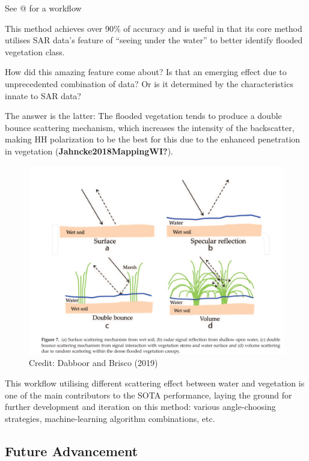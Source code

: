 \documentclass[
  letterpaper,
  DIV=11,
  numbers=noendperiod]{scrreprt}
\begin{document}
See @ for a workflow

This method achieves over 90\% of accuracy and is useful in that its
core method utilises SAR data's feature of ``seeing under the water'' to
better identify flooded vegetation class.

How did this amazing feature come about? Is that an emerging effect due
to unprecedented combination of data? Or is it determined by the
characteristics innate to SAR data?

The answer is the latter: The flooded vegetation tends to produce a
double bounce scattering mechanism, which increases the intensity of the
backscatter, making HH polarization to be the best for this due to the
enhanced penetration in vegetation (\textbf{Jahncke2018MappingWI?}).

\begin{figure}

{\centering \includegraphics{./images/WetLand_classification.png}

}

\caption{Credit: Dabboor and Brisco (2019)}

\end{figure}

This workflow utilising different scattering effect between water and
vegetation is one of the main contributors to the SOTA performance,
laying the ground for further development and iteration on this method:
various angle-choosing strategies, machine-learning algorithm
combinations, etc.

\hypertarget{future-advancement-1}{%
\subsection{Future Advancement}\label{future-advancement-1}}
\end{document}

